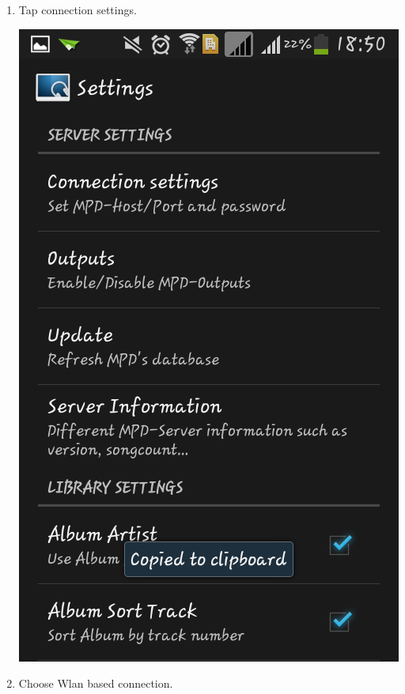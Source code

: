 \documentclass[letterpaper,10pt,english]{sphinxmanual}
\begin{document}
\begin{enumerate}
\item {} 
Tap connection settings.

\includegraphics{mpd3.png}

\item {} 
Choose Wlan based connection.


\end{enumerate}
\end{document}
